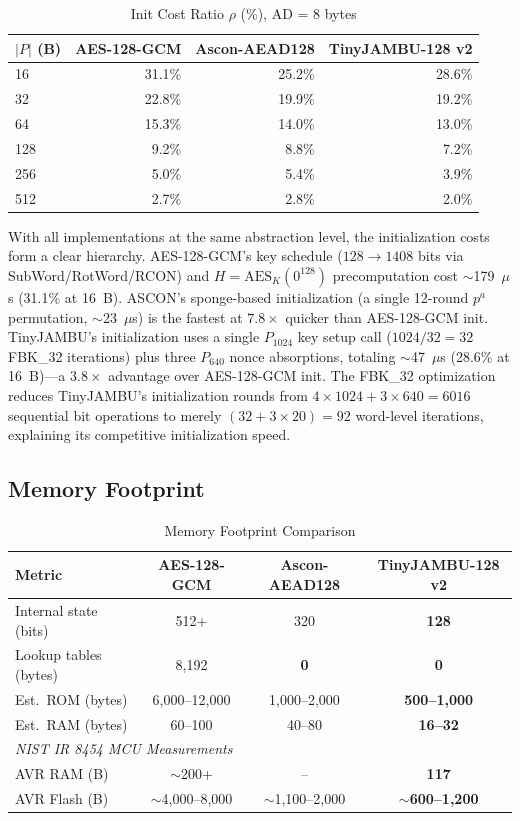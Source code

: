 \documentclass[11pt,a4paper]{article}
\newcommand{\AES}{\text{AES}}
\begin{document}
\begin{table}[H]
\centering
\caption{Init Cost Ratio $\rho$ (\%), AD = 8 bytes}
\label{tab:init}
\begin{tabular}{lrrr}
\toprule
\textbf{$|P|$ (B)} & \textbf{AES-128-GCM} & \textbf{Ascon-AEAD128} & \textbf{TinyJAMBU-128 v2} \\
\midrule
16  & 31.1\% & 25.2\% & 28.6\% \\
32  & 22.8\% & 19.9\% & 19.2\% \\
64  & 15.3\% & 14.0\% & 13.0\% \\
128 & 9.2\%  & 8.8\%  & 7.2\%  \\
256 & 5.0\%  & 5.4\%  & 3.9\%  \\
512 & 2.7\%  & 2.8\%  & 2.0\%  \\
\bottomrule
\end{tabular}
\end{table}

With all implementations at the same abstraction level, the initialization costs form a clear hierarchy. AES-128-GCM's key schedule ($128 \to 1408$ bits via SubWord/RotWord/RCON) and $H = \AES_K(0^{128})$ precomputation cost $\sim$179~$\mu$s (31.1\% at 16~B). ASCON's sponge-based initialization (a single 12-round $p^a$ permutation, $\sim$23~$\mu$s) is the fastest at $7.8\times$ quicker than AES-128-GCM init. TinyJAMBU's initialization uses a single $P_{1024}$ key setup call ($1024 / 32 = 32$ FBK\_32 iterations) plus three $P_{640}$ nonce absorptions, totaling $\sim$47~$\mu$s (28.6\% at 16~B)---a $3.8\times$ advantage over AES-128-GCM init. The FBK\_32 optimization reduces TinyJAMBU's initialization rounds from $4 \times 1024 + 3 \times 640 = 6016$ sequential bit operations to merely $(32 + 3 \times 20) = 92$ word-level iterations, explaining its competitive initialization speed.

\subsection{Memory Footprint}

\begin{table}[H]
\centering
\caption{Memory Footprint Comparison}
\label{tab:memory}
\begin{tabular}{lccc}
\toprule
\textbf{Metric} & \textbf{AES-128-GCM} & \textbf{Ascon-AEAD128} & \textbf{TinyJAMBU-128 v2} \\
\midrule
Internal state (bits) & 512+ & 320 & \textbf{128} \\
Lookup tables (bytes) & 8,192 & \textbf{0} & \textbf{0} \\
Est.\ ROM (bytes) & 6,000--12,000 & 1,000--2,000 & \textbf{500--1,000} \\
Est.\ RAM (bytes) & 60--100 & 40--80 & \textbf{16--32} \\
\midrule
\multicolumn{4}{l}{\textit{NIST IR 8454 MCU Measurements}} \\
AVR RAM (B) & $\sim$200+ & -- & \textbf{117} \\
AVR Flash (B) & $\sim$4,000--8,000 & $\sim$1,100--2,000 & \textbf{$\sim$600--1,200} \\
\bottomrule
\end{tabular}
\end{table}
\end{document}
